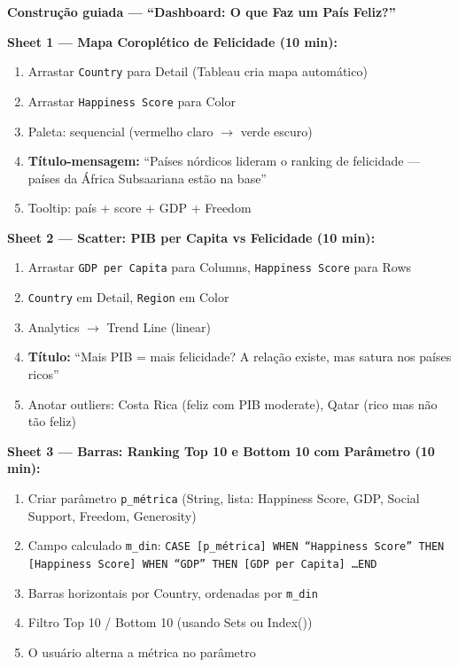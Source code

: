 \begin{SolvedBox}
\textbf{Construção guiada — ``Dashboard: O que Faz um País Feliz?''}

\textbf{Sheet 1 — Mapa Coroplético de Felicidade (10 min):}
\begin{enumerate}
  \item Arrastar \texttt{Country} para Detail (Tableau cria mapa automático)
  \item Arrastar \texttt{Happiness Score} para Color
  \item Paleta: sequencial (vermelho claro $\to$ verde escuro)
  \item \textbf{Título-mensagem:} ``Países nórdicos lideram o ranking de
  felicidade — países da África Subsaariana estão na base''
  \item Tooltip: país + score + GDP + Freedom
\end{enumerate}

\textbf{Sheet 2 — Scatter: PIB per Capita vs Felicidade (10 min):}
\begin{enumerate}
  \item Arrastar \texttt{GDP per Capita} para Columns,
  \texttt{Happiness Score} para Rows
  \item \texttt{Country} em Detail, \texttt{Region} em Color
  \item Analytics $\to$ Trend Line (linear)
  \item \textbf{Título:} ``Mais PIB = mais felicidade?
  A relação existe, mas satura nos países ricos''
  \item Anotar outliers: Costa Rica (feliz com PIB moderate),
  Qatar (rico mas não tão feliz)
\end{enumerate}

\textbf{Sheet 3 — Barras: Ranking Top 10 e Bottom 10 com Parâmetro (10 min):}
\begin{enumerate}
  \item Criar parâmetro \texttt{p\_métrica} (String, lista:
  Happiness Score, GDP, Social Support, Freedom, Generosity)
  \item Campo calculado \texttt{m\_din}:
  \texttt{CASE [p\_métrica] WHEN ``Happiness Score'' THEN [Happiness Score]
  WHEN ``GDP'' THEN [GDP per Capita] \ldots END}
  \item Barras horizontais por Country, ordenadas por \texttt{m\_din}
  \item Filtro Top 10 / Bottom 10 (usando Sets ou Index())
  \item O usuário alterna a métrica no parâmetro
\end{enumerate}


\end{SolvedBox}

